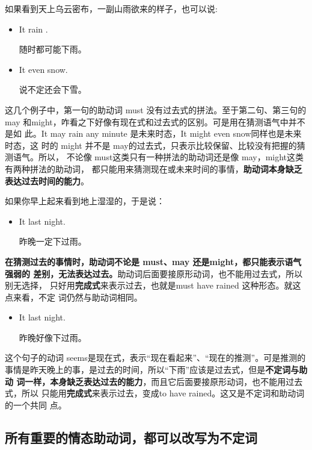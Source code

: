 如果看到天上乌云密布，一副山雨欲来的样子，也可以说:
\begin{itemize}
\item It  rain .

  随时都可能下雨。
\item It  even snow.

  说不定还会下雪。
\end{itemize}

这几个例子中，第一句的助动词 must 没有过去式的拼法。至于第二句、第三句的may
和might，咋看之下好像有现在式和过去式的区别。可是用在猜测语气中并不是如
此。It may rain any minute 是未来时态，It might even snow同样也是未来时态，这
时的 might 并不是 may的过去式，只表示比较保留、比较没有把握的猜测语气。所以，
不论像 must这类只有一种拼法的助动词还是像 may，might这类有两种拼法的助动词，
都只能用来猜测现在或未来时间的事情，\textbf{助动词本身缺乏表达过去时间的能力}。

如果你早上起来看到地上湿湿的，于是说：

\begin{itemize}
\item  It  last night.

  昨晚一定下过雨。
\end{itemize}

\textbf{在猜测过去的事情时，助动词不论是 must、may 还是might，都只能表示语气强弱的
  差别，无法表达过去。}助动词后面要接原形动词，也不能用过去式，所以别无选择，
只好用\textbf{完成式}来表示过去，也就是must have rained 这种形态。就这点来看，不定
词仍然与助动词相同。

\begin{itemize}
\item  It  last night.

  昨晚好像下过雨。
\end{itemize}

这个句子的动词 seems是现在式，表示“现在看起来”、“现在的推测”。可是推测的
事情是昨天晚上的事，是过去的时间，所以“下雨”应该是过去式，但是\textbf{不定词与助动
  词一样，本身缺乏表达过去的能力}，而且它后面要接原形动词，也不能用过去式，所以
只能用\textbf{完成式}来表示过去，变成to have rained。这又是不定词和助动词的一个共同
点。

\subsection{所有重要的情态助动词，都可以改写为不定词}


